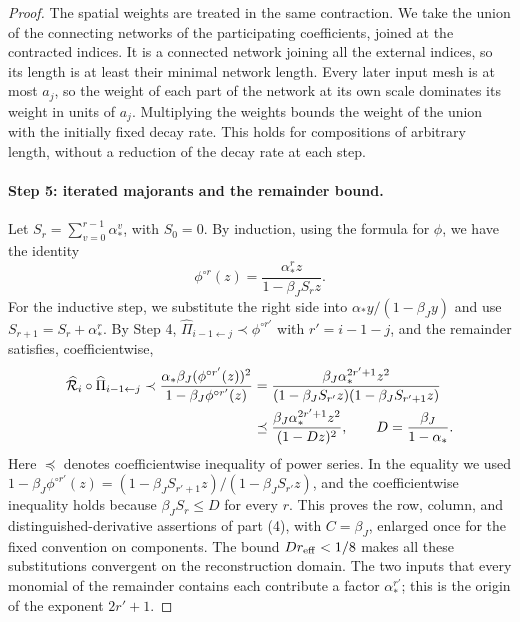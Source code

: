 \begin{proof}
The spatial weights are treated in the same contraction. We take the union of the connecting networks of the participating coefficients, joined at the contracted indices. It is a connected network joining all the external indices, so its length is at least their minimal network length. Every later input mesh is at most $a_j$, so the weight of each part of the network at its own scale dominates its weight in units of $a_j$. Multiplying the weights bounds the weight of the union with the initially fixed decay rate. This holds for compositions of arbitrary length, without a reduction of the decay rate at each step.

\paragraph{Step 5: iterated majorants and the remainder bound.}
Let $S_r=\sum_{v=0}^{r-1}\alpha_*^v$, with $S_0=0$. By induction, using the formula for $\phi$, we have the identity
\begin{equation}\label{ch28:eq:iterated-positive-series}
 \phi^{\circ r}(z)=\frac{\alpha_*^rz}{1-\beta_JS_rz}.
\end{equation}
For the inductive step, we substitute the right side into $\alpha_*y/(1-\beta_Jy)$ and use $S_{r+1}=S_r+\alpha_*^r$. By Step 4, $\widehat\Pi_{i-1\leftarrow j}\prec\phi^{\circ r'}$ with $r'=i-1-j$, and the remainder satisfies, coefficientwise,
\begin{align}
 \widehat{\mathcal R}_i\circ\widehat\Pi_{i-1\leftarrow j}\prec\frac{\alpha_*\beta_J(\phi^{\circ r'}(z))^2}{1-\beta_J\phi^{\circ r'}(z)}
 &=\frac{\beta_J\alpha_*^{2r'+1}z^2}{(1-\beta_JS_{r'}z)(1-\beta_JS_{r'+1}z)}\notag\\
 &\preceq\frac{\beta_J\alpha_*^{2r'+1}z^2}{(1-Dz)^2},\qquad D=\frac{\beta_J}{1-\alpha_*}.\label{ch28:eq:two-leg-source}
\end{align}
Here $\preceq$ denotes coefficientwise inequality of power series. In the equality we used $1-\beta_J\phi^{\circ r'}(z)=(1-\beta_JS_{r'+1}z)/(1-\beta_JS_{r'}z)$, and the coefficientwise inequality holds because $\beta_JS_r\le D$ for every $r$. This proves the row, column, and distinguished-derivative assertions of part (4), with $C=\beta_J$, enlarged once for the fixed convention on components. The bound $Dr_{\rm eff}<1/8$ makes all these substitutions convergent on the reconstruction domain. The two inputs that every monomial of the remainder contains each contribute a factor $\alpha_*^{r'}$; this is the origin of the exponent $2r'+1$.


\end{proof}
